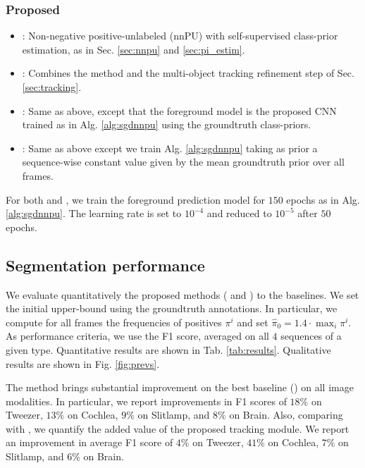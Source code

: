 \subsubsection{Proposed}
\label{sec:org83c59ba}
\begin{itemize}
\item \puss: Non-negative positive-unlabeled (nnPU) with self-supervised class-prior estimation, as in Sec. \ref{sec:nnpu} and \ref{sec:pi_estim}.
\item \kspss: Combines the \puss method and the multi-object tracking refinement step of Sec. \ref{sec:tracking}.
\item \ksptrue: Same as above, except that the foreground model is the proposed CNN trained as in Alg. \ref{alg:sgdnnpu} using the groundtruth class-priors.
\item \kspconst: Same as above except we train Alg. \ref{alg:sgdnnpu} taking as prior a sequence-wise constant value given by the mean groundtruth prior over all frames.
\end{itemize}
For both \ksptrue{} and \kspconst{}, we train the foreground prediction model for $150$ epochs as in Alg. \ref{alg:sgdnnpu}. The learning rate is set to $10^{-4}$ and reduced to $10^{-5}$ after $50$ epochs.

\subsection{Segmentation performance}

We evaluate quantitatively the proposed methods (\puss{} and \kspss{}) to the baselines.
We set the initial upper-bound using the groundtruth annotations.
In particular, we compute for all frames the frequencies of positives $\pi^{i}$ and set $\hat \pi_{0}=1.4 \cdot \max_{i}{\pi^{i}}$.
As performance criteria, we use the F1 score, averaged on all $4$ sequences of a given type.
Quantitative results are shown in Tab. \ref{tab:results}.
Qualitative results are shown in Fig. \ref{fig:prevs}.

The \kspss{} method brings substantial improvement on the best baseline (\ksp{}) on all image modalities.
In particular, we report improvements in F1 scores of $18\%$ on Tweezer, $13\%$ on Cochlea, $9\%$ on Slitlamp, and $8\%$ on Brain.
Also, comparing \puss{} with \kspss{}, we quantify the added value of the proposed tracking module.
We report an improvement in average F1 score of $4\%$ on Tweezer, $41\%$ on Cochlea, $7\%$ on Slitlamp, and $6\%$ on Brain.



